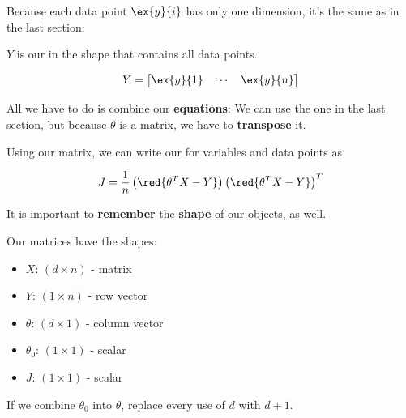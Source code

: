         Because each data point $\ex{y}{i}$ has only one dimension, it's the same as in the last section:\\
        
        \begin{kequation}
            $Y$ is our  in the shape  that contains all data points.
            
            \begin{equation*}
                Y = 
                    \begin{bmatrix}
                        \ex{y}{1} & \cdots & \ex{y}{n}
                    \end{bmatrix}
            \end{equation*}
        \end{kequation}
        
        All we have to do is combine our \textbf{equations}: We can use the one in the last section, but because $\theta$ is a matrix, we have to \textbf{transpose} it.
            \\
        
        \begin{kequation}
            Using our  matrix, we can write our  for  variables and  data points as
            
            \begin{equation*}
                J = \frac{1}{n}
                    \left( \red{ \theta^T X - Y} \right)
                    \left( \red{ \theta^T X - Y} \right)^T
            \end{equation*}
        \end{kequation}
        
        It is important to \textbf{remember} the \textbf{shape} of our objects, as well.\\
        
        \begin{concept}
            Our matrices have the shapes:
            
            \begin{itemize}
                \item $X$:        $(d \times n)$ - matrix
                \item $Y$:        $(1 \times n)$ - row vector\\
                
                \item $\theta$:   $(d \times 1)$ - column vector
                \item $\theta_0$: $(1 \times 1)$ - scalar\\
                
                \item $J$:        $(1 \times 1)$ - scalar
            \end{itemize}
            
            If we combine $\theta_0$ into $\theta$, replace every use of $d$ with $d+1$.
            
        \end{concept}
        
